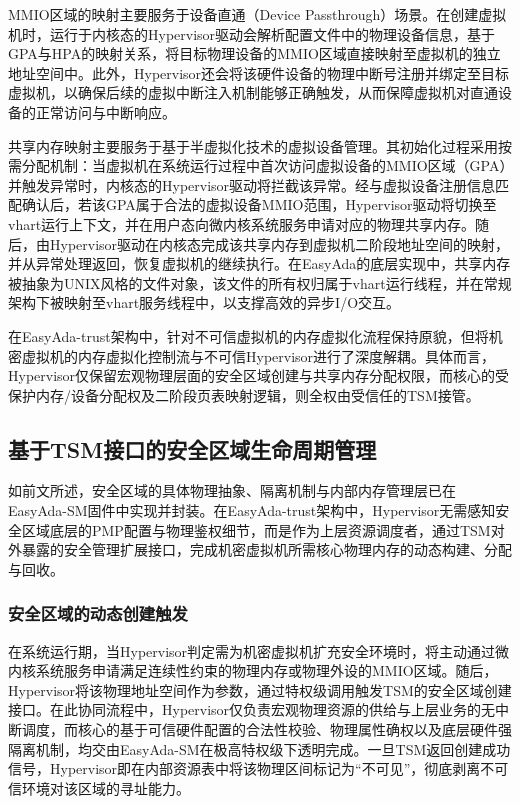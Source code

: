 \documentclass[master, vlined, review]{DissertUESTC}
\begin{document}
	MMIO区域的映射主要服务于设备直通（Device Passthrough）场景。在创建虚拟机时，运行于内核态的Hypervisor驱动会解析配置文件中的物理设备信息，基于GPA与HPA的映射关系，将目标物理设备的MMIO区域直接映射至虚拟机的独立地址空间中。此外，Hypervisor还会将该硬件设备的物理中断号注册并绑定至目标虚拟机，以确保后续的虚拟中断注入机制能够正确触发，从而保障虚拟机对直通设备的正常访问与中断响应。
	
	共享内存映射主要服务于基于半虚拟化技术的虚拟设备管理。其初始化过程采用按需分配机制：当虚拟机在系统运行过程中首次访问虚拟设备的MMIO区域（GPA）并触发异常时，内核态的Hypervisor驱动将拦截该异常。经与虚拟设备注册信息匹配确认后，若该GPA属于合法的虚拟设备MMIO范围，Hypervisor驱动将切换至vhart运行上下文，并在用户态向微内核系统服务申请对应的物理共享内存。随后，由Hypervisor驱动在内核态完成该共享内存到虚拟机二阶段地址空间的映射，并从异常处理返回，恢复虚拟机的继续执行。在EasyAda的底层实现中，共享内存被抽象为UNIX风格的文件对象，该文件的所有权归属于vhart运行线程，并在常规架构下被映射至vhart服务线程中，以支撑高效的异步I/O交互。
	
	在EasyAda-trust架构中，针对不可信虚拟机的内存虚拟化流程保持原貌，但将机密虚拟机的内存虚拟化控制流与不可信Hypervisor进行了深度解耦。具体而言，Hypervisor仅保留宏观物理层面的安全区域创建与共享内存分配权限，而核心的受保护内存/设备分配权及二阶段页表映射逻辑，则全权由受信任的TSM接管。
	
	\subsection{基于TSM接口的安全区域生命周期管理}
	如前文所述，安全区域的具体物理抽象、隔离机制与内部内存管理层已在EasyAda-SM固件中实现并封装。在EasyAda-trust架构中，Hypervisor无需感知安全区域底层的PMP配置与物理鉴权细节，而是作为上层资源调度者，通过TSM对外暴露的安全管理扩展接口，完成机密虚拟机所需核心物理内存的动态构建、分配与回收。
	
	\subsubsection{安全区域的动态创建触发}
	在系统运行期，当Hypervisor判定需为机密虚拟机扩充安全环境时，将主动通过微内核系统服务申请满足连续性约束的物理内存或物理外设的MMIO区域。随后，Hypervisor将该物理地址空间作为参数，通过特权级调用触发TSM的安全区域创建接口。在此协同流程中，Hypervisor仅负责宏观物理资源的供给与上层业务的无中断调度，而核心的基于可信硬件配置的合法性校验、物理属性确权以及底层硬件强隔离机制，均交由EasyAda-SM在极高特权级下透明完成。一旦TSM返回创建成功信号，Hypervisor即在内部资源表中将该物理区间标记为“不可见”，彻底剥离不可信环境对该区域的寻址能力。
	
\end{document}
